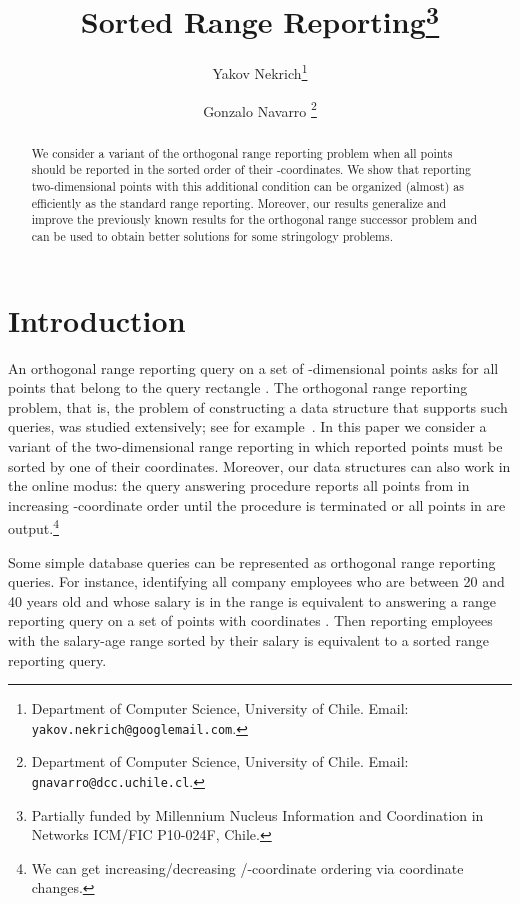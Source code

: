 \documentclass[11pt]{article}
\begin{document}
\title{Sorted Range Reporting\thanks{Partially funded by Millennium Nucleus Information and Coordination in
Networks ICM/FIC P10-024F, Chile.} }
\author
{
Yakov Nekrich\thanks{Department of Computer Science, University of Chile.
Email: {\tt yakov.nekrich@googlemail.com}.}
\and 
Gonzalo Navarro \thanks{Department of Computer Science, University of Chile.
Email: {\tt  gnavarro@dcc.uchile.cl}.}
}


\date{}
\maketitle
\begin{abstract}
We consider a variant of the orthogonal range reporting problem
when all points should be reported in the sorted order of their
 -coordinates. We show that reporting two-dimensional points with this
 additional condition can be organized  
(almost) as efficiently as the standard range reporting.
Moreover, our results generalize and improve the previously known results 
 for the orthogonal range successor problem and can be used to obtain better 
solutions for some stringology problems. 
\end{abstract}

\section{Introduction}
\label{sec:introduction}
An orthogonal range reporting query  on a set of -dimensional points 
 asks for all points  that belong to the query 
rectangle .  
The orthogonal range reporting problem, that is, the problem of constructing 
a data structure that supports such queries, was studied extensively; see
for example~\cite{agarwal1999geometric}.  
In this paper we consider  a variant of the two-dimensional range reporting  in which reported points must be sorted by one of their coordinates.  
Moreover, our data structures can also work in the online modus: the query answering procedure reports all points from  in 
 increasing -coordinate order
until the procedure is terminated or all points in  are output.\footnote{We can get increasing/decreasing 
/-coordinate ordering via coordinate changes.}

Some simple database queries can be represented as orthogonal range reporting 
queries. For instance, identifying all company employees who are between 
20 and 40 years old and whose salary is in the range  is equivalent 
to answering a range reporting query  on a set of 
points with coordinates . 
Then reporting employees with the salary-age range 
sorted by their salary is equivalent to 
a sorted range reporting query. 
\end{document}
